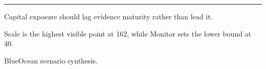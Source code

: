 \documentclass[10pt,a4paper]{article}
\begin{document}
\vspace{3pt}\noindent\begin{minipage}[t]{0.58\linewidth}
\textcolor{BOGreen}{\rule{24mm}{0.6pt}}\par\vspace{3pt}
{\footnotesize\color{BOText} Capital exposure should lag evidence maturity rather than lead it.}\par\vspace{2pt}
{\footnotesize\color{BOText} Scale is the highest visible point at 162, while Monitor sets the lower bound at 40.}\par\vspace{2pt}
\end{minipage}\hfill\begin{minipage}[t]{0.36\linewidth}
\par
\end{minipage}\par\vspace{2pt}
\par
{\scriptsize\color{BOMuted} BlueOcean scenario synthesis.}\par
\end{document}
